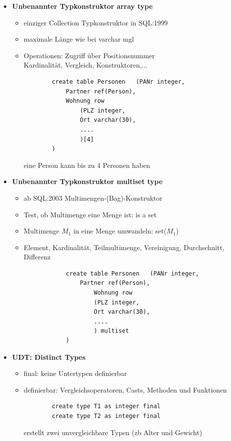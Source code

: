\begin{itemize}
	\item \textbf{Unbenannter Typkonstruktor array type}
	\begin{itemize}
		\item einziger Collection Typkonstruktor in SQL:1999
		\item maximale Länge wie bei varchar mgl
		\item Operationen: Zugriff über Positionsnummer\\
		Kardinalität, Vergleich, Konstruktoren,...
		\begin{lstlisting}
		create table Personen	(PANr integer,
			Partner ref(Person),
			Wohnung row
				(PLZ integer, 
				Ort varchar(30),
				....
				)[4]
		)
		\end{lstlisting}
		eine Person kann bis zu 4 Personen haben
	\end{itemize}
	
	\item \textbf{Unbenannter Typkonstruktor multiset type}
	\begin{itemize}
		\item ab SQL:2003 Multimengen-(Bag)-Konstruktor
		\item Test, ob Multimenge eine Menge ist: is a set
		\item Multimenge $M_1$ in eine Menge umwandeln: set($M_1$)
		\item Element, Kardinalität, Teilmultimenge, Vereinigung, Durchschnitt, Differenz
			\begin{lstlisting}
			create table Personen	(PANr integer,
				Partner ref(Person),
					Wohnung row
					(PLZ integer, 
					Ort varchar(30),
					....
					) multiset
			)
			\end{lstlisting}
	\end{itemize}
	
	\item \textbf{UDT: Distinct Types}
	\begin{itemize}
		\item final: keine Untertypen definierbar
		\item definierbar: Vergleichsoperatoren, Casts, Methoden und Funktionen
		\begin{lstlisting}
		create type T1 as integer final
		create type T2 as integer final
		\end{lstlisting}
		erstellt zwei unvergleichbare Typen (zb Alter und Gewicht)
	\end{itemize}
	

\end{itemize}
